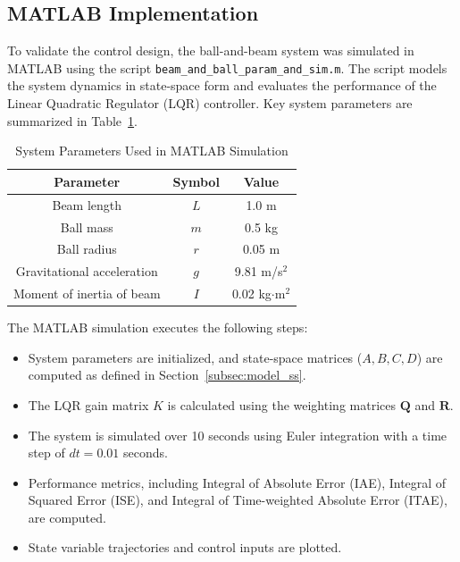 \documentclass[conference]{IEEEtran}
\begin{document}
\subsection{MATLAB Implementation}
\label{subsec:matlab_implementation}

To validate the control design, the ball-and-beam system was simulated in MATLAB using the script \texttt{beam\_and\_ball\_param\_and\_sim.m}. The script models the system dynamics in state-space form and evaluates the performance of the Linear Quadratic Regulator (LQR) controller. Key system parameters are summarized in Table~\ref{tab:system_params}.

\begin{table}[htbp]
\caption[]{System Parameters Used in MATLAB Simulation}
\label{tab:system_params}
\centering
\begin{tabular}{|c|c|c|}
\hline
\textbf{Parameter} & \textbf{Symbol} & \textbf{Value} \\ \hline
Beam length & \(L\) & 1.0 m \\ \hline
Ball mass & \(m\) & 0.5 kg \\ \hline
Ball radius & \(r\) & 0.05 m \\ \hline
Gravitational acceleration & \(g\) & 9.81 m/s\(^2\) \\ \hline
Moment of inertia of beam & \(I\) & 0.02 kg$\cdot$m\(^2\) \\ \hline
\end{tabular}
\end{table}

The MATLAB simulation executes the following steps:
\begin{itemize}
    \item System parameters are initialized, and state-space matrices (\(A, B, C, D\)) are computed as defined in Section~\ref{subsec:model_ss}.
    \item The LQR gain matrix \(K\) is calculated using the weighting matrices \(\mathbf{Q}\) and \(\mathbf{R}\).
    \item The system is simulated over 10 seconds using Euler integration with a time step of \(dt = 0.01\) seconds.
    \item Performance metrics, including Integral of Absolute Error (IAE), Integral of Squared Error (ISE), and Integral of Time-weighted Absolute Error (ITAE), are computed.
    \item State variable trajectories and control inputs are plotted.
\end{itemize}
\end{document}
